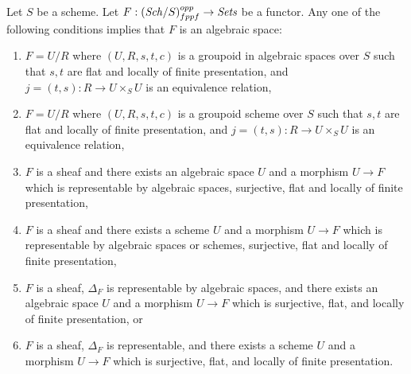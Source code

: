 \begin{theorem}
\label{theorem-final-bootstrap}
Let $S$ be a scheme.
Let $F : (\mathit{Sch}/S)_{fppf}^{opp} \to \textit{Sets}$ be a functor.
Any one of the following conditions implies that $F$ is an algebraic space:
\begin{enumerate}
\item $F = U/R$ where $(U, R, s, t, c)$ is a groupoid in algebraic spaces
over $S$ such that $s, t$ are flat and locally of finite presentation, and
$j = (t, s) : R \to U \times_S U$ is an equivalence relation,
\item $F = U/R$ where $(U, R, s, t, c)$ is a groupoid scheme
over $S$ such that $s, t$ are flat and locally of finite presentation, and
$j = (t, s) : R \to U \times_S U$ is an equivalence relation,
\item $F$ is a sheaf and there exists an algebraic space $U$ and a morphism
$U \to F$ which is representable by algebraic spaces,
surjective, flat and locally of finite presentation,
\item $F$ is a sheaf and there exists a scheme $U$ and a morphism
$U \to F$ which is representable by algebraic spaces or schemes,
surjective, flat and locally of finite presentation,
\item $F$ is a sheaf, $\Delta_F$ is representable by algebraic spaces,
and there exists an algebraic space $U$ and a morphism $U \to F$ which is
surjective, flat, and locally of finite presentation, or
\item $F$ is a sheaf, $\Delta_F$ is representable,
and there exists a scheme $U$ and a morphism $U \to F$ which is
surjective, flat, and locally of finite presentation.
\end{enumerate}
\end{theorem}

